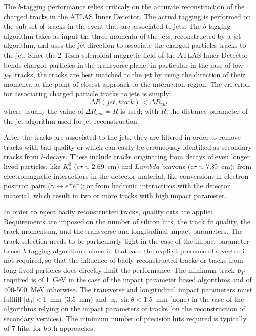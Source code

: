 \begin{itemize}
The $b$-tagging performance relies criticaly on the accurate reconstruction of the charged tracks in the ATLAS Inner Detector.  The actual tagging is performed on the sub-set of tracks in the event that are associated to jets.  The $b$-tagging algorithm takes as input the three-momenta of the jets, reconstructed by a jet algorithm, and uses the jet direction to associate the charged particles tracks to the jet. Since the 2 Tesla solenoidal magnetic field of the ATLAS Inner Detector bends charged particles in the transverse plane, in particular in the case of low ${\emph{p}_{T}}$ tracks, the tracks are best matched to the jet by using the direction of their momenta at the point of closest approach to the interaction region.  The criterion for associating charged particle tracks to jets is simply:
%
\begin{equation}
\Delta R(jet, track) < \Delta R_{cut}
\end{equation}
%
where usually the value of $\Delta R_{cut} = R$ is used; with $R$, the distance parameter of the jet algorithm used for jet reconstruction.

After the tracks are associated to the jets, they are filtered in order to remove tracks with bad quality or which can easily be erroneously identified as secondary tracks from $b$-decays. These include tracks originating from decays of even longer lived particles, like $K^0_s$ (c$\tau \approx$2.69~cm) and $Lambda$ baryons (c$\tau \approx$7.89~cm); from electromagnetic interactions in the detector material, like conversions in electron-positron pairs ($\gamma \rightarrow e^+ e^-$); or from hadronic interactions with the detector material, which result in two or more tracks with high impact parameter.

In order to reject badly reconstructed tracks, quality cuts are applied. Requirements are imposed on the number of silicon hits, the track fit quality,  the track momentum, and the transverse and longitudinal impact parameters. The track selection needs to be particularly tight in the case of the impact parameter based $b$-tagging algorithms, since in that case the explicit presence of a vertex is not required, so that the influence of badly reconstructed tracks or tracks from long lived particles does directly limit the performance. The minimum track ${\emph{p}_{T}}$ required is of 1~GeV in the case of the impact parameter based algorithms and of 400-500~MeV otherwise. The transverse and longitudinal
impact parameters must fullfill  $|d_0|<$1~mm (3.5~mm) and $|z_0| \sin \theta < 1.5$~mm (none) in the case of the algorithms relying on the impact parameters of tracks (on the reconstruction of secondary vertices).  The minimum number of precision hits required is typically of 7 hits, for both approaches. 



\end{itemize}
